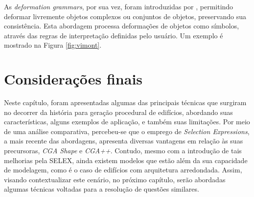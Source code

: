 \begin{figure}[h!]
	\centering
	\captionsetup{width=15cm}
	{}	
\end{figure}

As \textit{deformation grammars}, por sua vez, foram introduzidas por , permitindo deformar livremente objetos complexos ou conjuntos de objetos, preservando sua consistência. Esta abordagem processa deformações de objetos como símbolos, através das regras de interpretação definidas pelo usuário. Um exemplo é mostrado na Figura \ref{fig:vimont}.

\begin{figure}[h!]
	\centering
	\captionsetup{width=15cm}
	{}	
\end{figure}

\section{Considerações finais}
\label{sec:consideracoes_capitulo_2}

Neste capítulo, foram apresentadas algumas das principais técnicas que surgiram no decorrer da história para geração procedural de edifícios, abordando suas características, alguns exemplos de aplicação, e também suas limitações. Por meio de uma análise comparativa, percebeu-se que o emprego de \textit{Selection Expressions}, a mais recente das abordagens, apresenta diversas vantagens em relação às suas precursoras, \textit{CGA Shape} e \textit{CGA++}. Contudo, mesmo com a introdução de tais melhorias pela \gls{SELEX}, ainda existem modelos que estão além da sua capacidade de modelagem, como é o caso de edifícios com arquitetura arredondada. Assim, visando contextualizar este cenário, no próximo capítulo, serão abordadas algumas técnicas voltadas para a resolução de questões similares.
